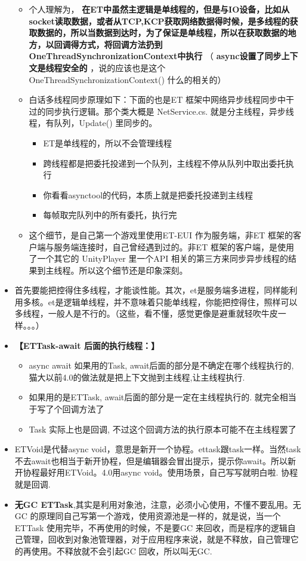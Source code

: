 \documentclass[9pt, b5paper]{article}
\begin{document}
\begin{itemize}
\begin{itemize}
\item 个人理解为， \textbf{在ET中虽然主逻辑是单线程的，但是与IO设备，比如从socket读取数据，或者从TCP,KCP获取网络数据得时候，是多线程的获取数据的，所以当数据到达时，为了保证是单线程，所以在获取数据的地方，以回调得方式，将回调方法扔到OneThreadSynchronizationContext中执行} （ \textbf{async设置了同步上下文是线程安全的} ，说的应该也是这个 OneThreadSynchronizationContext() 什么的相关的）
\item 白话多线程同步原理如下：下面的也是ET 框架中网络异步线程同步中干过的同步执行逻辑。那个类大概是 NetService.cs. 就是分主线程，异步线程，有队列，Update() 里同步的。
\begin{itemize}
\item ET是单线程的，所以不会管理线程
\item 跨线程都是把委托投递到一个队列，主线程不停从队列中取出委托执行
\item 你看看asynctool的代码，本质上就是把委托投递到主线程
\item 每帧取完队列中的所有委托，执行完
\end{itemize}
\item 这个细节，是自己第一个游戏里使用ET-EUI 作为服务端，非ET 框架的客户端与服务端连接时，自己曾经遇到过的。非ET 框架的客户端，是使用了一个其它的 UnityPlayer 里一个API 相关的第三方来同步异步线程的结果到主线程。所以这个细节还是印象深刻。
\end{itemize}
\item 首先要能把控得住多线程，才能谈性能。其次，et是服务端多进程，同样能利用多核。et是逻辑单线程，并不意味着只能单线程，你能把控得住，照样可以多线程，一般人是不行的。（这些，看不懂，感觉更像是避重就轻吹牛皮一样。。。）
\item \textbf{【ETTask-await 后面的执行线程：】}
\begin{itemize}
\item async await 如果用的Task, await后面的部分是不确定在哪个线程执行的,猫大以前4.0的做法就是把上下文抛到主线程,让主线程执行.
\item 如果用的是ETTask, await后面的部分是一定在主线程执行的. 就完全相当于写了个回调方法了
\item Task 实际上也是回调, 不过这个回调方法的执行原本可能不在主线程罢了
\end{itemize}
\item ETVoid是代替async void，意思是新开一个协程。ettask跟task一样。当然task不去await也相当于新开协程，但是编辑器会冒出提示，提示你await。所以新开协程最好用ETVoid。4.0用async void。使用场景，自己写写就明白啦. 协程就是回调.
\item \textbf{无GC ETTask},其实是利用对象池，注意，必须小心使用，不懂不要乱用。无GC 的原理同自己写第一个游戏，使用资源池是一样的，就是说，当一个ETTask 使用完毕，不再使用的时候，不是要GC 来回收，而是程序的逻辑自己管理，回收到对象池管理器，对于应用程序来说，就是不释放，自己管理它的再使用。不释放就不会引起GC 回收，所以叫无GC.

\end{itemize}
\end{document}
